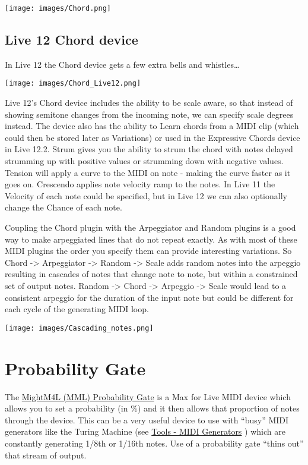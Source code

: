 \documentclass[
  12pt,
  letterpaper,
  oneside,
  open=any]{scrbook}
\begin{document}
\texttt{[image: images/Chord.png]}

\subsection{Live 12 Chord device}\label{live-12-chord-device}

In Live 12 the Chord device gets a few extra bells and whistles\ldots{}

\texttt{[image: images/Chord\_Live12.png]}

Live 12's Chord device includes the ability to be scale aware, so that
instead of showing semitone changes from the incoming note, we can
specify scale degrees instead. The device also has the ability to Learn
chords from a MIDI clip (which could then be stored later as Variations)
or used in the Expressive Chords device in Live 12.2. Strum gives you
the ability to strum the chord with notes delayed strumming up with
positive values or strumming down with negative values. Tension will
apply a curve to the MIDI on note - making the curve faster as it goes
on. Crescendo applies note velocity ramp to the notes. In Live 11 the
Velocity of each note could be specified, but in Live 12 we can also
optionally change the Chance of each note.

Coupling the Chord plugin with the Arpeggiator and Random plugins is a
good way to make arpeggiated lines that do not repeat exactly. As with
most of these MIDI plugins the order you specify them can provide
interesting variations. So Chord -\textgreater{} Arpeggiator
-\textgreater{} Random -\textgreater{} Scale adds random notes into the
arpeggio resulting in cascades of notes that change note to note, but
within a constrained set of output notes. Random -\textgreater{} Chord
-\textgreater{} Arpeggio -\textgreater{} Scale would lead to a
consistent arpeggio for the duration of the input note but could be
different for each cycle of the generating MIDI loop.

\texttt{[image: images/Cascading\_notes.png]}

\section{Probability Gate}\label{probability-gate}

The
\href{https://maxforlive.com/library/device/6982/mm4l-probability-gate\#:~:text=Device\%20Details&text=Probability\%20keeps\%20things\%20interesting\%2C\%20and,that\%20extra\%20bit\%20of\%20variation.}{MightM4L
(MML) Probability Gate} is a Max for Live MIDI device which allows you
to set a probability (in \%) and it then allows that proportion of notes
through the device. This can be a very useful device to use with
``busy'' MIDI generators like the Turing Machine (see
\hyperref[Chapter-012-Tools-MIDI_Generators]{Tools - MIDI Generators} )
which are constantly generating 1/8th or 1/16th notes. Use of a
probability gate ``thins out'' that stream of output.
\end{document}
